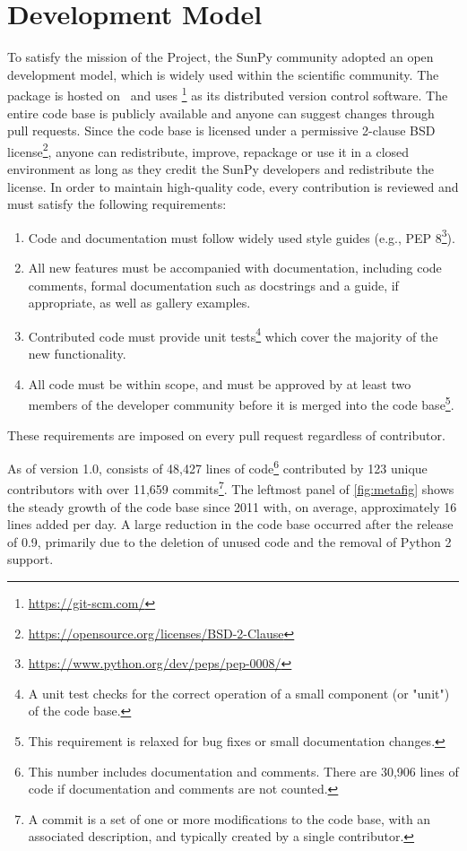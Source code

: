\section{Development Model}
\label{sec:development}

To satisfy the mission of the Project, the SunPy community adopted an open development model, which is widely used within the scientific \python community.
The \sunpypkg package is hosted on \github\, and uses \footnote{\url{https://git-scm.com/}} as its distributed version control software.
The entire code base is publicly available and anyone can suggest changes through pull requests.
Since the code base is licensed under a permissive 2-clause BSD license\footnote{\url{https://opensource.org/licenses/BSD-2-Clause}}, anyone can redistribute, improve, repackage or use it in a closed environment as long as they credit the SunPy developers and redistribute the license.
In order to maintain high-quality code, every contribution is reviewed and must satisfy the following requirements:
\begin{enumerate}
    \item Code and documentation must follow widely used style guides (e.g., PEP 8\footnote{\url{https://www.python.org/dev/peps/pep-0008/}}).
    \item All new features must be accompanied with documentation, including code comments, formal documentation such as \python docstrings and a guide, if appropriate, as well as gallery examples.
    \item Contributed code must provide unit tests\footnote{A unit test checks for the correct operation of a small component (or "unit") of the code base.} which cover the majority of the new functionality.
    \item All code must be within scope, and must be approved by at least two members of the developer community before it is merged into the code base\footnote{This requirement is relaxed for bug fixes or small documentation changes.}.
\end{enumerate}
These requirements are imposed on every pull request regardless of contributor.

As of version 1.0, \sunpypkg consists of 48,427 lines of code\footnote{This number includes documentation and comments.
There are 30,906 lines of code if documentation and comments are not counted.} contributed by 123 unique contributors with over 11,659 commits\footnote{A commit is a set of one or more modifications to the code base, with an associated description, and typically created by a single contributor.}.
The leftmost panel of \autoref{fig:metafig} shows the steady growth of the code base since 2011 with, on average, approximately 16 lines added per day.
A large reduction in the code base occurred after the release of 0.9, primarily due to the deletion of unused code and the removal of Python 2 support.

